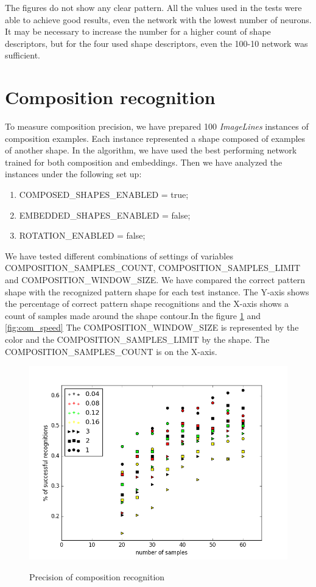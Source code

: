 The figures do not show any clear pattern. All the values used in the tests were able to achieve good results, even the network with the lowest number of neurons. It may be necessary to increase the number for a higher count of shape descriptors, but for the four used shape descriptors, even the 100-10 network was sufficient.

\section{Composition recognition}
To measure composition precision, we have prepared 100 \emph{ImageLines} instances of composition examples. Each instance represented a shape composed of examples of another shape. In the algorithm, we have used the best performing network trained for both composition and embeddings. Then we have analyzed the instances under the following set up:
\begin{enumerate}
\item COMPOSED\_SHAPES\_ENABLED = true;
\item EMBEDDED\_SHAPES\_ENABLED = false;
\item ROTATION\_ENABLED = false;
\end{enumerate}
We have tested different combinations of settings of variables COMPOSITION\_SAMPLES\_COUNT, COMPOSITION\_SAMPLES\_LIMIT and COMPOSITION\_WINDOW\_SIZE. We have compared the correct pattern shape with the recognized pattern shape for each test instance. The Y-axis shows the percentage of correct pattern shape recognitions and the X-axis shows a count of samples made around the shape contour.In the figure \ref{fig:com} and \ref{fig:com_speed} The COMPOSITION\_WINDOW\_SIZE is represented by the color and the COMPOSITION\_SAMPLES\_LIMIT by the shape. The COMPOSITION\_SAMPLES\_COUNT is on the X-axis. 
\begin{figure}[!htb]
\begin{center}
\label{fig:com}
\includegraphics[width=\linewidth]{ext/figure_composition.png}
\end{center}
    \centering
    \caption{Precision of composition recognition}
\end{figure}
